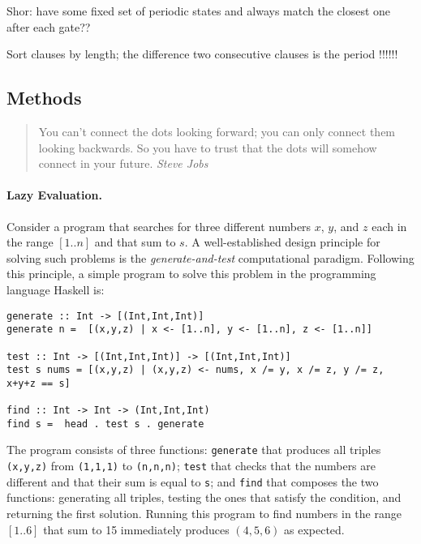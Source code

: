 \documentclass{article}
\begin{document}
\begin{refsection}
{Shor: have some fixed set of periodic states and always match the
closest one after each gate??

Sort clauses by length; the difference two consecutive clauses is the period !!!!!!

}


\printbibliography[heading=subbibliography]
\end{refsection}


\begin{refsection}
\section{Methods}

\begin{quote}
You can’t connect the dots looking forward; you can only connect them
looking backwards.  So you have to trust that the dots will somehow
connect in your future. \emph{Steve Jobs}
\end{quote}

\paragraph*{Lazy Evaluation.}
Consider a program that searches for three different numbers $x$, $y$,
and $z$ each in the range $[1..n]$ and that sum to $s$. A
well-established design principle for solving such problems is the
\emph{generate-and-test} computational paradigm. Following this
principle, a simple program to solve this problem in the programming
language Haskell is:

\begin{verbatim}
generate :: Int -> [(Int,Int,Int)]
generate n =  [(x,y,z) | x <- [1..n], y <- [1..n], z <- [1..n]]

test :: Int -> [(Int,Int,Int)] -> [(Int,Int,Int)]
test s nums = [(x,y,z) | (x,y,z) <- nums, x /= y, x /= z, y /= z, x+y+z == s]

find :: Int -> Int -> (Int,Int,Int)
find s =  head . test s . generate
\end{verbatim}

The program consists of three functions: \verb|generate| that produces
all triples \verb|(x,y,z)| from \verb|(1,1,1)| to \verb|(n,n,n)|;
\verb|test| that checks that the numbers are different and that their
sum is equal to \verb|s|; and \verb|find| that composes the two
functions: generating all triples, testing the ones that satisfy the
condition, and returning the first solution. Running this program to
find numbers in the range $[1..6]$ that sum to 15 immediately produces
$(4,5,6)$ as expected.


\end{refsection}
\end{document}
